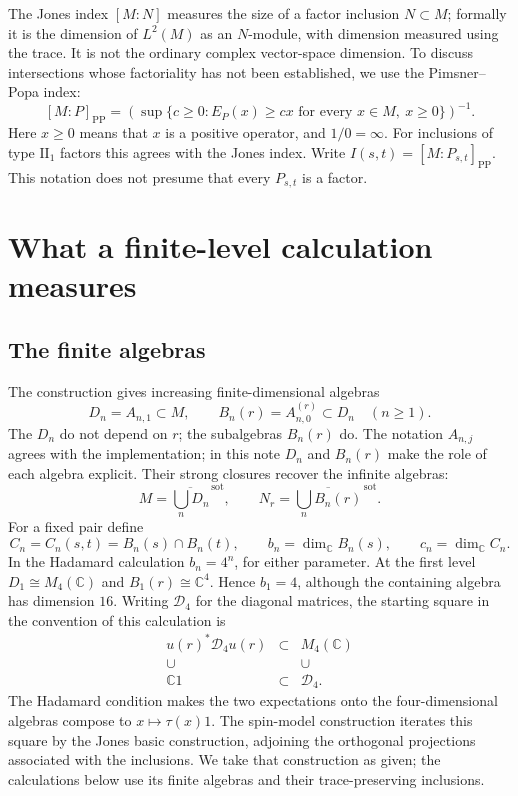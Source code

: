 \documentclass[11pt]{article}
\theoremstyle{definition}
\theoremstyle{remark}
\newcommand{\C}{\mathbb C}
\newcommand{\tr}{\tau}
\newcommand{\PP}{\operatorname{PP}}
\newcommand{\sot}{\mathrm{sot}}
\begin{document}
The Jones index \([M:N]\) measures the size of a factor inclusion
\(N\subset M\); formally it is the dimension of \(L^2(M)\) as an
\(N\)-module, with dimension measured using the trace. It is not the
ordinary complex vector-space dimension. To discuss intersections whose
factoriality has not been established, we use the Pimsner--Popa index:
\begin{equation}\label{eq:pp}
 [M:P]_{\PP}
 =\left(\sup\{c\geq0:E_P(x)\geq c x
                    \text{ for every }x\in M,\ x\geq0\}\right)^{-1}.
\end{equation}
Here \(x\geq0\) means that \(x\) is a positive operator, and \(1/0=\infty\).
For inclusions of type \(\mathrm{II}_1\) factors this agrees with the
Jones index. Write \(I(s,t)=[M:P_{s,t}]_{\PP}\).
This notation does not presume that every \(P_{s,t}\) is a factor.

\section{What a finite-level calculation measures}\label{sec:finite}
\subsection{The finite algebras}
The construction gives increasing finite-dimensional algebras
\[
 D_n=A_{n,1}\subset M,\qquad
 B_n(r)=A_{n,0}^{(r)}\subset D_n\quad(n\geq1).
\]
The \(D_n\) do not depend on \(r\); the subalgebras \(B_n(r)\) do.
The notation \(A_{n,j}\) agrees with the implementation; in this note
\(D_n\) and \(B_n(r)\) make the role of each algebra explicit.
Their strong closures recover the infinite algebras:
\[
 M=\overline{\bigcup_nD_n}^{\,\sot},\qquad
 N_r=\overline{\bigcup_nB_n(r)}^{\,\sot}.
\]
For a fixed pair define
\begin{equation}\label{eq:finiteintersection}
 C_n=C_n(s,t)=B_n(s)\cap B_n(t),\qquad
 b_n=\dim_{\C}B_n(s),\qquad c_n=\dim_{\C}C_n.
\end{equation}
In the Hadamard calculation \(b_n=4^n\), for either parameter.
At the first level \(D_1\cong M_4(\C)\) and \(B_1(r)\cong\C^4\).
Hence \(b_1=4\), although the containing algebra has dimension \(16\).
Writing \(\mathcal D_4\) for the diagonal matrices, the starting square
in the convention of this calculation is
\[
 \begin{matrix}
 u(r)^*\mathcal D_4u(r)&\subset&M_4(\C)\\
 \cup&&\cup\\
 \C1&\subset&\mathcal D_4.
 \end{matrix}
\]
The Hadamard condition makes the two expectations onto the
four-dimensional algebras compose to \(x\mapsto\tr(x)1\).
The spin-model construction iterates this square by the Jones basic
construction, adjoining the orthogonal projections associated with the
inclusions. We take that construction as given; the calculations below
use its finite algebras and their trace-preserving inclusions.
\end{document}

